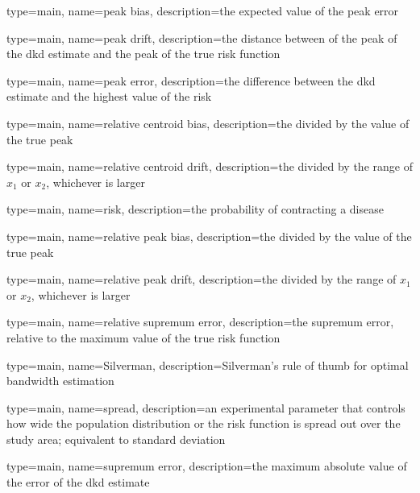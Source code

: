{%
   type=main,
   name={peak bias},
   description={the expected value of the peak error}
}

{%
   type=main,
   name={peak drift},
   description={the distance between of the peak of the dkd estimate and the peak of the true risk function}
}

{%
   type=main,
   name={peak error},
   description={the difference between the dkd estimate and the highest value of the risk}
}

{%
   type=main,
   name={relative centroid bias},
   description={the  divided by the value of the true peak}
}

{%
   type=main,
   name={relative centroid drift},
   description={the  divided by the range of \ensuremath{x_1} or \ensuremath{x_2}, whichever is larger}
}

{
   type=main,
   name={risk},
   description={the probability of contracting a disease}
}

{%
   type=main,
   name={relative peak bias},
   description={the  divided by the value of the true peak}
}

{%
   type=main,
   name={relative peak drift},
   description={the  divided by the range of \ensuremath{x_1} or \ensuremath{x_2}, whichever is larger}
}

{%
   type=main,
   name={relative supremum error},
   description={the supremum error, relative to the maximum value of the true risk function}
}

{
   type=main,
   name={Silverman},
   description={Silverman's rule of thumb for optimal bandwidth estimation}
}

{
   type=main,
   name={spread},
   description={an experimental parameter that controls how wide the population distribution or the risk function is spread out over the study area; equivalent to standard deviation}
}

{%
   type=main,
   name={supremum error},
   description={the maximum absolute value of the error of the dkd estimate}
}


